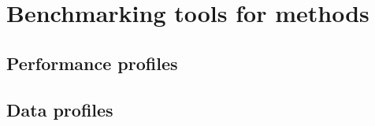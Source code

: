 \section{Benchmarking tools for  methods}

\subsection{Performance profiles}

\subsection{Data profiles}
